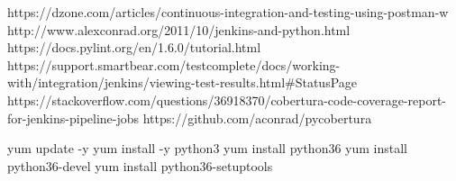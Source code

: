 https://dzone.com/articles/continuous-integration-and-testing-using-postman-w
http://www.alexconrad.org/2011/10/jenkins-and-python.html
https://docs.pylint.org/en/1.6.0/tutorial.html
https://support.smartbear.com/testcomplete/docs/working-with/integration/jenkins/viewing-test-results.html#StatusPage
https://stackoverflow.com/questions/36918370/cobertura-code-coverage-report-for-jenkins-pipeline-jobs
https://github.com/aconrad/pycobertura



yum update -y
yum install -y python3
yum install python36
yum install python36-devel
yum install python36-setuptools
